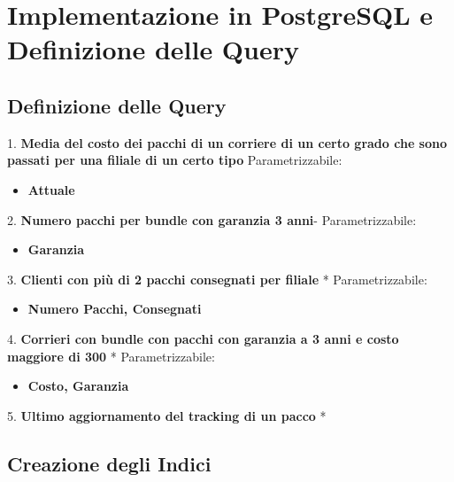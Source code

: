 \section{Implementazione in PostgreSQL e Definizione
delle Query}

\subsection{Definizione delle Query}


1. \textbf{Media del costo dei pacchi di un corriere di un certo grado che sono passati per una filiale di un certo tipo}
  Parametrizzabile:
    \begin{itemize}
        \setlength{\itemindent}{+.5in}
        \item \textbf{Attuale}
        \end{itemize}
2. \textbf{Numero pacchi per bundle con garanzia 3 anni}-
  Parametrizzabile:
    \begin{itemize}
        \setlength{\itemindent}{+.5in}
        \item \textbf{Garanzia}
        \end{itemize}
3. \textbf{Clienti con più di 2 pacchi consegnati per filiale} *
  Parametrizzabile:
    \begin{itemize}
        \setlength{\itemindent}{+.5in}
        \item \textbf{Numero Pacchi, Consegnati}
        \end{itemize}
4. \textbf{Corrieri con bundle con pacchi con garanzia a 3 anni e costo maggiore di 300} *
    Parametrizzabile:
        \begin{itemize}
            \setlength{\itemindent}{+.5in}
            \item \textbf{Costo, Garanzia}
            \end{itemize}
5. \textbf{Ultimo aggiornamento del tracking di un pacco} *
\subsection{Creazione degli Indici} 